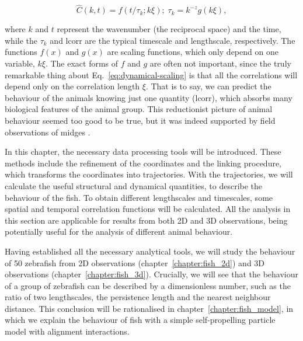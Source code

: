 \documentclass[11pt,twoside]{report}
\begin{document}
\begin{equation}
\hat{C}(k, t) =f\left(t / \tau_{k} ; k \xi\right);\;
\tau_{k} =k^{-z} g(k \xi),
\label{eq:dynamical-scaling}
\end{equation}

\noindent where $k$ and $t$ represent the wavenumber (the reciprocal space) and the time, while the $\tau_k$ and \gls{lcorr} are the typical timescale and lengthscale, respectively. The functions $f(x)$ and $g(x)$ are scaling functions, which only depend on one variable, $k \xi$. The exact forms of $f$ and $g$ are often not important, since the truly remarkable thing about Eq.~\ref{eq:dynamical-scaling} is that all the correlations will depend only on the correlation length $\xi$. That is to say, we can predict the behaviour of the animals knowing just one quantity (lcorr), which absorbs many biological features of the animal group. This reductionist picture of animal behaviour seemed too good to be true, but it was indeed supported by field observations of midges \cite{cavagna2017np}.

In this chapter, the necessary data processing tools will be introduced. These methods include the refinement of the coordinates and the linking procedure, which transforms the coordinates into trajectories.
With the trajectories, we will calculate the useful structural and dynamical quantities, to describe the behaviour of the fish. To obtain different lengthscales and timescales, some spatial and temporal correlation functions will be calculated. All the analysis in this section are applicable for results from both 2D and 3D observations, being potentially useful for the analysis of different animal behaviour.

Having established all the necessary analytical tools, we will study the behaviour of 50 zebrafish from 2D observations (chapter~\ref{chapter:fish_2d}) and 3D observations (chapter~\ref{chapter:fish_3d}). 
Crucially, we will see that the behaviour of a group of zebrafish can be described by a dimensionless number, such as the ratio of two lengthscales, the persistence length and the nearest neighbour distance. This conclusion will be rationalised in chapter~\ref{chapter:fish_model}, in which we explain the behaviour of fish with a simple self-propelling particle model with alignment interactions.
\end{document}
